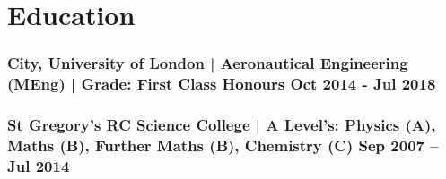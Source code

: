 \documentclass[a4paper,9pt]{article}
\begin{document}
\section*{Education}
\subsubsection*{\textbf {City, University of London | Aeronautical Engineering (MEng)} | Grade: First Class Honours   \hfill \textbf{Oct 2014 - Jul 2018}}\FloatBarrier

\subsubsection*{\textbf{St Gregory’s RC Science College} | A Level's: Physics (A), Maths (B), Further Maths (B), Chemistry (C)  \hfill  \textbf{Sep 2007 – Jul 2014}}

\date{}
\end{document}
